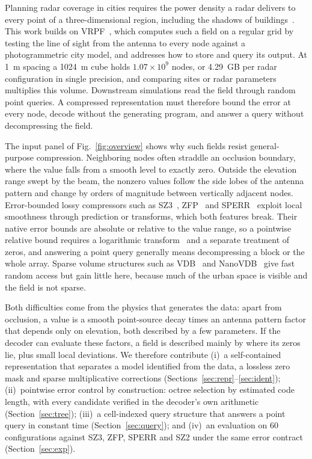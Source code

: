 \documentclass[conference]{IEEEtran}
\begin{document}
Planning radar coverage in cities requires the power density a radar delivers to every point of a three-dimensional region, including the shadows of buildings~\cite{kostic2003radar,chen2008representation}. This work builds on VRPF~\cite{jiao2026vrpf}, which computes such a field on a regular grid by testing the line of sight from the antenna to every node against a photogrammetric city model, and addresses how to store and query its output. At 1~m spacing a 1024~m cube holds $1.07\times10^9$ nodes, or 4.29~GB per radar configuration in single precision, and comparing sites or radar parameters multiplies this volume. Downstream simulations read the field through random point queries. A compressed representation must therefore bound the error at every node, decode without the generating program, and answer a query without decompressing the field.

The input panel of Fig.~\ref{fig:overview} shows why such fields resist general-purpose compression. Neighboring nodes often straddle an occlusion boundary, where the value falls from a smooth level to exactly zero. Outside the elevation range swept by the beam, the nonzero values follow the side lobes of the antenna pattern and change by orders of magnitude between vertically adjacent nodes. Error-bounded lossy compressors such as SZ3~\cite{liang2023sz3}, ZFP~\cite{lindstrom2014zfp} and SPERR~\cite{li2023sperr} exploit local smoothness through prediction or transforms, which both features break. Their native error bounds are absolute or relative to the value range, so a pointwise relative bound requires a logarithmic transform~\cite{liang2018pwr,zou2019msst} and a separate treatment of zeros, and answering a point query generally means decompressing a block or the whole array. Sparse volume structures such as VDB~\cite{museth2013vdb} and NanoVDB~\cite{museth2021nanovdb} give fast random access but gain little here, because much of the urban space is visible and the field is not sparse.

Both difficulties come from the physics that generates the data: apart from occlusion, a value is a smooth point-source decay times an antenna pattern factor that depends only on elevation, both described by a few parameters. If the decoder can evaluate these factors, a field is described mainly by where its zeros lie, plus small local deviations. We therefore contribute (i)~a self-contained representation that separates a model identified from the data, a lossless zero mask and sparse multiplicative corrections (Sections~\ref{sec:repr}--\ref{sec:ident}); (ii)~pointwise error control by construction: octree selection by estimated code length, with every candidate verified in the decoder's own arithmetic (Section~\ref{sec:tree}); (iii)~a cell-indexed query structure that answers a point query in constant time (Section~\ref{sec:query}); and (iv)~an evaluation on 60 configurations against SZ3, ZFP, SPERR and SZ2 under the same error contract (Section~\ref{sec:exp}).
\end{document}
